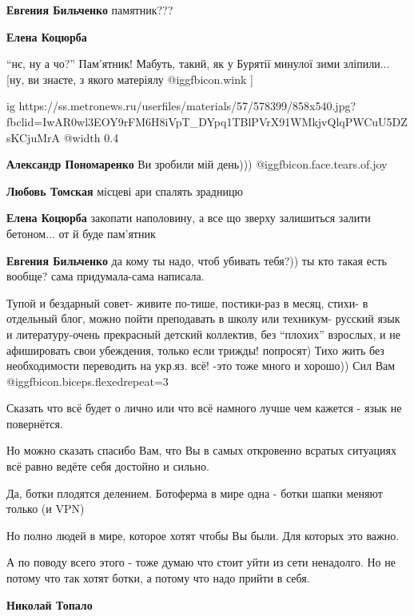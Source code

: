 \begin{itemize}
\begin{itemize}
\textbf{Евгения Бильченко} памятник???

\textbf{Елена Коцюрба} 

\enquote{нє, ну а чо?} Пам'ятник! Мабуть, такий, як у Бурятії минулої зими
зліпили... [ну, ви знаєте, з якого матеріялу  @igg{fbicon.wink}  ]

\ifcmt
  ig https://ss.metronews.ru/userfiles/materials/57/578399/858x540.jpg?fbclid=IwAR0wl3EOY9rFM6H8iVpT_DYpq1TBlPVrX91WMkjvQlqPWCuU5DZsKCjuMrA
  @width 0.4
\fi

\textbf{Александр Пономаренко} Ви зробили мій день))) @igg{fbicon.face.tears.of.joy} 

\textbf{Любовь Томская} місцеві ари спалять зрадницю

\textbf{Елена Коцюрба} закопати наполовину, а все що зверху залишиться залити бетоном... от й буде пам'ятник

\textbf{Евгения Бильченко} да кому ты надо, чтоб убивать тебя?)) ты кто такая есть вообще? сама придумала-сама написала.

\end{itemize} %


Тупой и бездарный совет- живите по-тише, постики-раз в месяц, стихи- в
отдельный блог, можно пойти преподавать в школу или техникум- русский язык и
литературу-очень прекрасный детский коллектив, без \enquote{плохих} взрослых, и не
афишировать свои убеждения, только если трижды! попросят) Тихо жить без
необходимости переводить на укр.яз. всё! -это тоже много и хорошо)) Сил
Вам @igg{fbicon.biceps.flexed}{repeat=3} 



Сказать что всё будет о лично или что всё намного лучше чем кажется - язык не
повернётся.

Но можно сказать спасибо Вам, что Вы в самых откровенно всратых ситуациях всё
равно ведёте себя достойно и сильно.

Да, ботки плодятся делением. Ботоферма в мире одна - ботки шапки меняют только
(и VPN)

Но полно людей в мире, которое хотят чтобы Вы были. Для которых это важно.

А по поводу всего этого - тоже думаю что стоит уйти из сети ненадолго. Но не
потому что так хотят ботки, а потому что надо прийти в себя.

\begin{itemize} %
\textbf{Николай Топало} 


\end{itemize}
\end{itemize}
